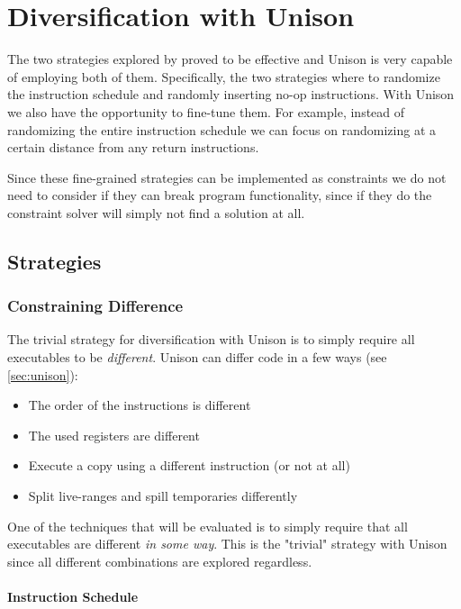 \chapter{Diversification with Unison}

The two strategies explored by \textcite{large-scale-automated} proved to be
effective and Unison is very capable of employing both of them. Specifically, the two
strategies where to randomize the instruction schedule and randomly inserting no-op
instructions. With Unison we also have the opportunity to fine-tune them. For example,
instead of randomizing the entire instruction schedule we can focus on randomizing at a
certain distance from any return instructions.

Since these fine-grained strategies can be implemented as constraints we do not need to
consider if they can break program functionality, since if they do the constraint solver
will simply not find a solution at all.

\section{Strategies}

\subsection{Constraining Difference}

The trivial strategy for diversification with Unison is to simply require all executables
to be \textit{different}. Unison can differ code in a few ways (see \ref{sec:unison}):

\begin{itemize}
	\item The order of the instructions is different
	\item The used registers are different
	\item Execute a copy using a different instruction (or not at all)
	\item Split live-ranges and spill temporaries differently
\end{itemize}

One of the techniques that will be evaluated is to simply require that all executables
are different \textit{in some way}. This is the "trivial" strategy with Unison since all
different combinations are explored regardless.

\subsubsection{Instruction Schedule}

